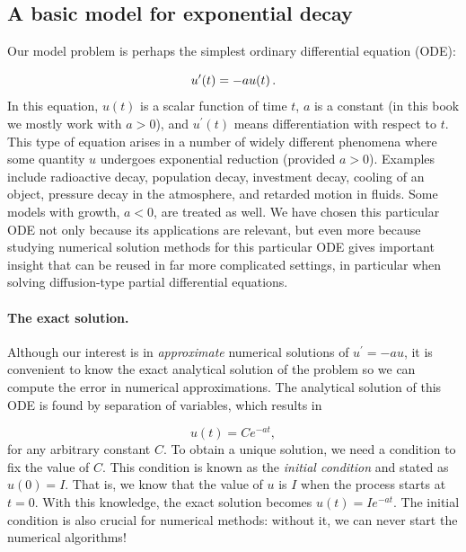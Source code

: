 \documentclass[%
oneside,                 %
final,                   %
10pt]{article}
\begin{document}
\subsection{A basic model for exponential decay}
\label{decay:model}

 

Our model problem is perhaps the simplest ordinary differential
equation (ODE):

\begin{equation*}
u^{\prime}(t) = -au(t)\thinspace .
\end{equation*}
In this equation, $u(t)$ is a scalar function of time $t$,
$a$ is a constant (in this book we mostly work with $a>0$),
and $u^{\prime}(t)$ means differentiation with
respect to $t$. This type of equation arises in a number of
widely different phenomena where some quantity $u$ undergoes
exponential reduction (provided $a>0$).
Examples include radioactive decay, population
decay, investment decay, cooling of an object, pressure decay in the
atmosphere, and retarded motion in fluids. Some models with growth,
$a<0$, are treated as
well.
We have chosen this particular ODE not only because
its applications are relevant, but even more because studying
numerical solution methods for this particular ODE gives important insight
that can be reused in far more complicated settings, in particular
when solving diffusion-type partial differential equations.

\paragraph{The exact solution.}
Although our interest is in \emph{approximate} numerical solutions of
$u^{\prime}=-au$, it is convenient to know the exact analytical
solution of the problem so we can compute the error in numerical
approximations.  The analytical solution of this ODE is found by
separation of variables, which results in

\begin{equation*} u(t) = Ce^{-at},\end{equation*}
for any arbitrary constant $C$.
To obtain a unique solution, we need a condition to fix the value of $C$.
This condition is known as the \emph{initial condition} and stated as
$u(0)=I$. That is, we know that the value of $u$ is $I$ when the process
starts at $t=0$. With this knowledge, the exact solution becomes
$u(t)=Ie^{-at}$. The initial condition is also crucial for numerical
methods: without it, we can never start the numerical algorithms!
\end{document}
